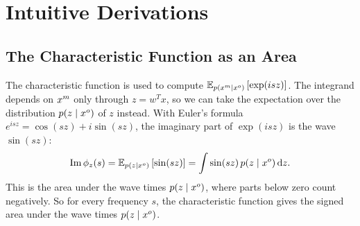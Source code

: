 \chapter{Intuitive Derivations}
\label{app:intuition}

\section{The Characteristic Function as an Area}
\label{app:cf-area}

The characteristic function is used to compute $\mathbb{E}_{p(x^m \mid x^o)} \left[ \exp(isz) \right]$.
The integrand depends on $x^m$ only through $z = w^T x$, so we can take the expectation over the distribution $p(z \mid x^o)$ of $z$ instead.
With Euler's formula $e^{isz} = \cos(sz) + i \sin(sz)$, the imaginary part of $\exp(isz)$ is the wave $\sin(sz)$:
\[
  \mathrm{Im}\, \phi_z(s) = \mathbb{E}_{p(z \mid x^o)} \left[ \sin(sz) \right] = \int \sin(sz)\, p(z \mid x^o) \, \mathrm{d}z.
\]
This is the area under the wave times $p(z \mid x^o)$, where parts below zero count negatively.
So for every frequency $s$, the characteristic function gives the signed area under the wave times $p(z \mid x^o)$.
